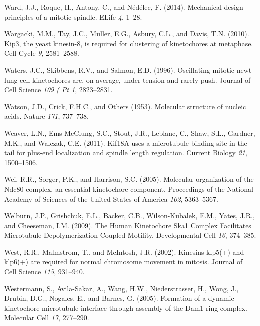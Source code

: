 \documentclass[12pt,a4paper,twoside,openright]{book}
\begin{document}
Ward, J.J., Roque, H., Antony, C., and Nédélec, F. (2014). Mechanical
design principles of a mitotic spindle. ELife \emph{4}, 1--28.

Wargacki, M.M., Tay, J.C., Muller, E.G., Asbury, C.L., and Davis, T.N.
(2010). Kip3, the yeast kinesin-8, is required for clustering of
kinetochores at metaphase. Cell Cycle \emph{9}, 2581--2588.

Waters, J.C., Skibbens, R.V., and Salmon, E.D. (1996). Oscillating
mitotic newt lung cell kinetochores are, on average, under tension and
rarely push. Journal of Cell Science \emph{109 ( Pt 1}, 2823--2831.

Watson, J.D., Crick, F.H.C., and Others (1953). Molecular structure of
nucleic acids. Nature \emph{171}, 737--738.

Weaver, L.N., Ems-McClung, S.C., Stout, J.R., Leblanc, C., Shaw, S.L.,
Gardner, M.K., and Walczak, C.E. (2011). Kif18A uses a microtubule
binding site in the tail for plus-end localization and spindle length
regulation. Current Biology \emph{21}, 1500--1506.

Wei, R.R., Sorger, P.K., and Harrison, S.C. (2005). Molecular
organization of the Ndc80 complex, an essential kinetochore component.
Proceedings of the National Academy of Sciences of the United States of
America \emph{102}, 5363--5367.

Welburn, J.P., Grishchuk, E.L., Backer, C.B., Wilson-Kubalek, E.M.,
Yates, J.R., and Cheeseman, I.M. (2009). The Human Kinetochore Ska1
Complex Facilitates Microtubule Depolymerization-Coupled Motility.
Developmental Cell \emph{16}, 374--385.

West, R.R., Malmstrom, T., and McIntosh, J.R. (2002). Kinesins klp5(+)
and klp6(+) are required for normal chromosome movement in mitosis.
Journal of Cell Science \emph{115}, 931--940.

Westermann, S., Avila-Sakar, A., Wang, H.W., Niederstrasser, H., Wong,
J., Drubin, D.G., Nogales, E., and Barnes, G. (2005). Formation of a
dynamic kinetochore-microtubule interface through assembly of the Dam1
ring complex. Molecular Cell \emph{17}, 277--290.
\end{document}
